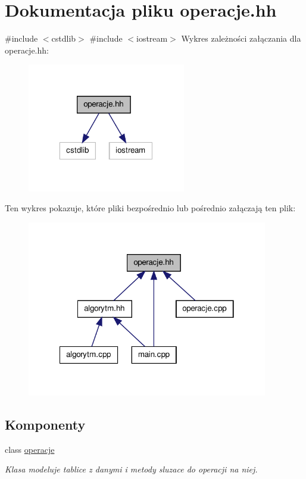 \hypertarget{operacje_8hh}{\section{\-Dokumentacja pliku operacje.\-hh}
\label{operacje_8hh}
}
{\ttfamily \#include $<$cstdlib$>$}\*
{\ttfamily \#include $<$iostream$>$}\*
\-Wykres zależności załączania dla operacje.\-hh\-:
\nopagebreak
\begin{figure}[H]
\begin{center}
\leavevmode
\includegraphics[width=196pt]{operacje_8hh__incl}
\end{center}
\end{figure}
\-Ten wykres pokazuje, które pliki bezpośrednio lub pośrednio załączają ten plik\-:
\nopagebreak
\begin{figure}[H]
\begin{center}
\leavevmode
\includegraphics[width=298pt]{operacje_8hh__dep__incl}
\end{center}
\end{figure}
\subsection*{\-Komponenty}
\begin{DoxyCompactItemize}
\item 
class \hyperlink{classoperacje}{operacje}
\begin{DoxyCompactList}\small\item\em \-Klasa modeluje tablice z danymi i metody sluzace do operacji na niej. \end{DoxyCompactList}\end{DoxyCompactItemize}
